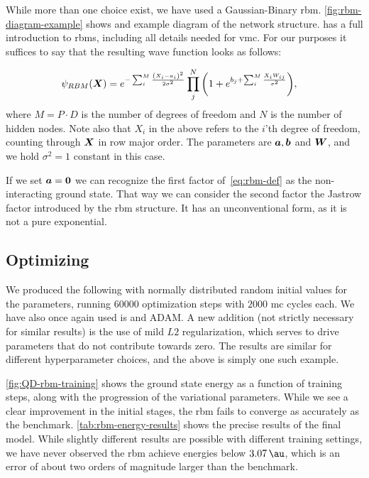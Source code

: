 \documentclass[Thesis.tex]{subfiles}
\begin{document}
While more than one choice exist, we have used a Gaussian-Binary \gls{rbm}\@.
\cref{fig:rbm-diagram-example} shows and example diagram of the network
structure. \textcite{Flugsrud-2018} has a full introduction to \glspl{rbm}, including
all details needed for \gls{vmc}\@. For our purposes it suffices to say that the
resulting wave function looks as follows:

\begin{align}
  \label{eq:rbm-def}
  \psi_{RBM}(\bm{X}) &=
        e^{-\sum_i^{M} \frac{\qty(X_i-a_i)^2}{2\sigma^2}}
        \prod_j^N \qty(1 + e^{b_j+\sum_i^M \frac{X_iW_{ij}}{\sigma^2}}),
\end{align}
where $M = P\cdot D$ is the number of degrees of freedom and $N$ is the number
of hidden nodes. Note also that $X_i$ in the above refers to the $i$'th degree
of freedom, counting through $\bm{X}$ in row major order. The parameters are
$\bm{a}, \bm{b}$ and $\bm{W}$, and we hold $\sigma^2=1$ constant in this case.

If we set $\bm{a} = \bm{0}$ we can recognize the first factor of~\cref{eq:rbm-def}
as the non-interacting ground state. That way we can consider the second factor
the Jastrow factor introduced by the \gls{rbm} structure. It has an unconventional
form, as it is not a pure exponential.


\subsection{Optimizing}

We produced the following with normally distributed random
initial values for the parameters, running $\num{60000}$ optimization steps with
$\num{2000}$ \gls{mc} cycles each. We have also once again used \acrlong{is}
and ADAM\@. A new addition (not strictly necessary for similar results) is the use
of mild $L2$ regularization, which serves to drive parameters that do not
contribute towards zero. The results are similar for different hyperparameter
choices, and the above is simply one such example.

\cref{fig:QD-rbm-training} shows the ground state energy as a function of
training steps, along with the progression of the variational
parameters. While we see a clear improvement in the initial stages, the \gls{rbm}
fails to converge as accurately as the benchmark. \cref{tab:rbm-energy-results}
shows the precise results of the final model. While slightly different results
are possible with different training settings, we have never observed the \gls{rbm}
achieve energies below $\SI{3.07}{\au}$, which is an error of about two orders
of magnitude larger than the benchmark.
\end{document}
